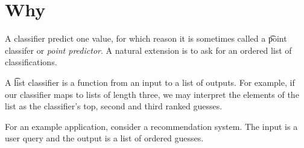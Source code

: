 
\section*{Why}

A classifier predict one value, for which reason it is sometimes called a \t{point classifer} or \textit{point predictor}.
A natural extension is to ask for an ordered list of classifications.

A \t{list classifier} is a function from an input to a list of outputs.
For example, if our classifier maps to lists of length three, we may interpret the elements of the list as the classifier's top, second and third ranked guesses.

For an example application, consider a recommendation system.
The input is a user query and the output is a list of ordered guesses.


\blankpage
